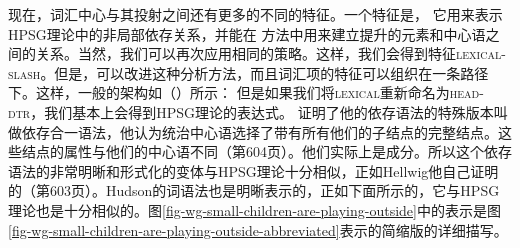 %
现在，词汇中心与其投射之间还有更多的不同的特征。一个特征是\slaschc， 它用来表示HPSG理论中的非局部依存关系，并能在 \citet{GO2009a}方法中用来建立提升的元素和中心语之间的关系。当然，我们可以再次应用相同的策略。这样，我们会得到特征\textsc{lexical-slash}。但是，可以改进这种分析方法，而且词汇项的特征可以组织在一条路径下。这样，一般的架构如（）所示：
\ea
{}
\z
但是如果我们将\textsc{lexical}重新命名为\textsc{head-dtr}，我们基本上会得到HPSG理论的表达式。
%
 \citet[]{Hellwig2003a}证明了他的依存语法的特殊版本叫做依存合一语法，他认为统治中心语选择了带有所有他们的子结点的完整结点。这些结点的属性与他们的中心语不同（第604页）。他们实际上是成分。所以这个依存语法的非常明晰和形式化的变体与HPSG理论十分相似，正如Hellwig他自己证明的（第603页）。Hudson的词语法也是明晰表示的，正如下面所示的，它与HPSG理论也是十分相似的。图\vref{fig-wg-small-children-are-playing-outside}中的表示是图\vref{fig-wg-small-children-are-playing-outside-abbreviated}表示的简缩版的详细描写。
%

